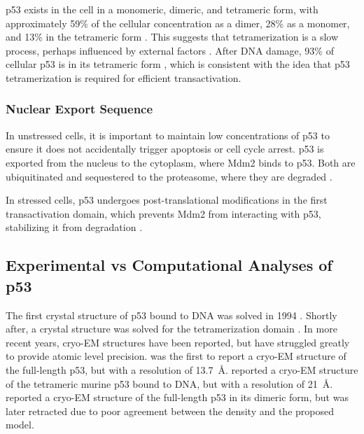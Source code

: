 p53 exists in the cell in a monomeric, dimeric, and tetrameric form, with approximately 59\% of the cellular concentration as a dimer, 28\% as a monomer, and 13\% in the tetrameric form \parencite{gaglia2013activation}. This suggests that tetramerization is a slow process, perhaps influenced by external factors \parencite{natan2009ultraslow}. After DNA damage, 93\% of cellular p53 is in its tetrameric form \parencite{gaglia2013activation}, which is consistent with the idea that p53 tetramerization is required for efficient transactivation.

\subsubsection{Nuclear Export Sequence}

In unstressed cells, it is important to maintain low concentrations of p53 to ensure it does not accidentally trigger apoptosis or cell cycle arrest. p53 is exported from the nucleus to the cytoplasm, where Mdm2 binds to p53. Both are ubiquitinated and sequestered to the proteasome, where they are degraded \parencite{sparksDegradationP53Its2014}.

In stressed cells, p53 undergoes post-translational modifications in the first transactivation domain, which prevents Mdm2 from interacting with p53, stabilizing it from degradation \parencite{ashcroftStressSignalsUtilize2000}.

\subsection{Experimental vs Computational Analyses of p53}

The first crystal structure of p53 bound to DNA was solved in 1994 \parencite{choCrystalStructureP531994}. Shortly after, a crystal structure was solved for the tetramerization domain \parencite{jeffreyCrystalStructureTetramerization1995}. In more recent years, cryo-EM structures have been reported, but have struggled greatly to provide atomic level precision. \textcite{okorokovStructureP53Tumour2006} was the first to report a cryo-EM structure of the full-length p53, but with a resolution of \qty{13.7}{\angstrom}. \textcite{aramayoQuaternaryStructureSpecific2011} reported a cryo-EM structure of the tetrameric murine p53 bound to DNA, but with a resolution of \qty{21}{\angstrom}. \textcite{solaresHighResolutionImagingHuman2022} reported a cryo-EM structure of the full-length p53 in its dimeric form, but was later retracted due to poor agreement between the density and the proposed model.

